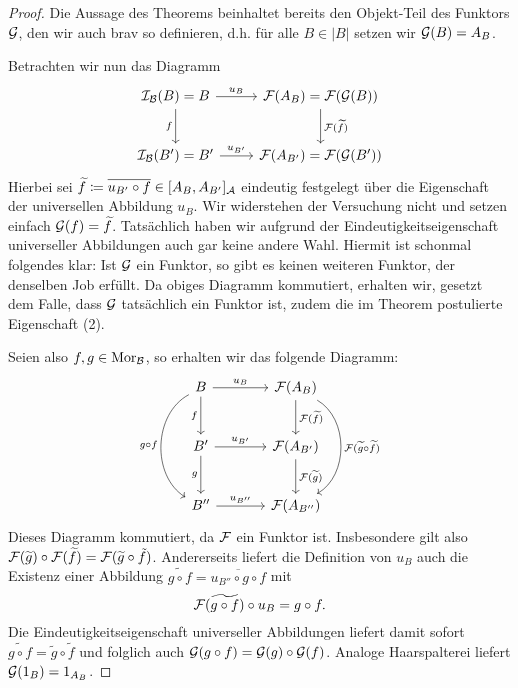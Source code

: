 \begin{proof}
  Die Aussage des Theorems beinhaltet bereits den Objekt-Teil des Funktors $\mathcal{G}$, den wir auch brav so definieren, d.h. für alle $B \in |B|$ setzen wir $\mathcal{G}(B) = A_B$.

  Betrachten wir nun das Diagramm
  $$
    \begin{tikzcd}[row sep=2.5em]
      \I_\B(B)  = B \arrow[r,"u_B"] \arrow[d,"f"'] & \F(A_B)     = \F(\G(B)) \arrow[d,"\F(\widetilde f)"] 
      \\ 
      \I_\B(B') = B'\arrow[r,"u_{B'}"]              & \F(A_{B'})  = \F(\G(B')) 
    \end{tikzcd}
    $$
    Hierbei sei $\widetilde f \coloneqq \overline{u_{B'} \circ f} \in [A_B, A_{B'}]_{\mathcal{A}}$ eindeutig festgelegt über die Eigenschaft der universellen Abbildung $u_B$.
    Wir widerstehen der Versuchung nicht und setzen einfach $\mathcal{G}(f) = \widetilde f$. 
    Tatsächlich haben wir aufgrund der Eindeutigkeitseigenschaft universeller Abbildungen auch gar keine andere Wahl.
    Hiermit ist schonmal folgendes klar: Ist $\mathcal{G}$ ein Funktor, so gibt es keinen weiteren Funktor, der denselben Job erfüllt. 
    Da obiges Diagramm kommutiert, erhalten wir, gesetzt dem Falle, dass $\mathcal{G}$ tatsächlich ein Funktor ist, zudem die im Theorem postulierte Eigenschaft (2).

    Seien also $f,g \in  \mathrm{Mor}_{\mathcal{B}}$, so erhalten wir das folgende Diagramm:
    $$
        \begin{tikzcd}[column sep=3.5em,row sep=2.5em]
          B \arrow[r,"u_B"] \arrow[d,"f"'] \arrow[dd,"g \circ f"',bend right=60]    & \F(A_B)    \arrow[d,"\F(\widetilde f)"] \arrow[dd, bend left=60, "\F(\widetilde g \circ \widetilde f)"] 
      \\ 
      B'\arrow[r,"u_{B'}"] \arrow[d,"g"'] & \F(A_{B'}) \arrow[d ,"\F(\widetilde g)"] \\
      B''\arrow[r,"u_{B''}"]              & \F(A_{B''}) 
    \end{tikzcd}
    $$
    Dieses Diagramm kommutiert, da $\mathcal{F}$ ein Funktor ist.
    Insbesondere gilt also $\mathcal{F}(\widetilde g) \circ \mathcal{F}(\widetilde f) = \mathcal{F}(\widetilde g \circ \tilde f)$. 
    Andererseits liefert die Definition von $u_B$ auch die Existenz einer Abbildung $\widetilde{g \circ f} = \overline{u_{B''} \circ g \circ f}$ mit 
    $$
    \mathcal{F}(\widetilde{g \circ f}) \circ u_B = g \circ f .
    $$
    Die Eindeutigkeitseigenschaft universeller Abbildungen liefert damit sofort $\widetilde{g \circ f} = \widetilde g \circ \widetilde f$ und folglich auch $\mathcal{G}(g \circ f) = \mathcal{G}(g) \circ \mathcal{G}(f)$.
    Analoge Haarspalterei liefert $\mathcal{G}(1_B) = 1_{A_B}$.  
\end{proof}

